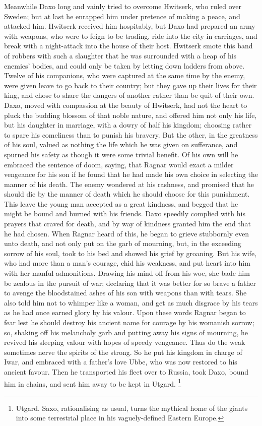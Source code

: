 \documentclass[10pt,a4paper]{report}
\begin{document}
Meanwhile Daxo long and vainly tried to overcome Hwitserk, who ruled over Sweden; but at last he enrapped him under pretence of making a peace, and attacked him. Hwitserk received him hospitably, but Daxo had prepared an army with weapons, who were to feign to be trading, ride into the city in carriages, and break with a night-attack into the house of their host. Hwitserk smote this band of robbers with such a slaughter that he was surrounded with a heap of his enemies' bodies, and could only be taken by letting down ladders from above. Twelve of his companions, who were captured at the same time by the enemy, were given leave to go back to their country; but they gave up their lives for their king, and chose to share the dangers of another rather than be quit of their own.\\

Daxo, moved with compassion at the beauty of Hwitserk, had not the heart to pluck the budding blossom of that noble nature, and offered him not only his life, but his daughter in marriage, with a dowry of half his kingdom; choosing rather to spare his comeliness than to punish his bravery. But the other, in the greatness of his soul, valued as nothing the life which he was given on sufferance, and spurned his safety as though it were some trivial benefit. Of his own will he embraced the sentence of doom, saying, that Ragnar would exact a milder vengeance for his son if he found that he had made his own choice in selecting the manner of his death. The enemy wondered at his rashness, and promised that he should die by the manner of death which he should choose for this punishment. This leave the young man accepted as a great kindness, and begged that he might be bound and burned with his friends. Daxo speedily complied with his prayers that craved for death, and by way of kindness granted him the end that he had chosen. When Ragnar heard of this, he began to grieve stubbornly even unto death, and not only put on the garb of mourning, but, in the exceeding sorrow of his soul, took to his bed and showed his grief by groaning. But his wife, who had more than a man's courage, chid his weakness, and put heart into him with her manful admonitions. Drawing his mind off from his woe, she bade him be zealous in the pursuit of war; declaring that it was better for so brave a father to avenge the bloodstained ashes of his son with weapons than with tears. She also told him not to whimper like a woman, and get as much disgrace by his tears as he had once earned glory by his valour. Upon these words Ragnar began to fear lest he should destroy his ancient name for courage by his womanish sorrow; so, shaking off his melancholy garb and putting away his signs of mourning, he revived his sleeping valour with hopes of speedy vengeance. Thus do the weak sometimes nerve the spirits of the strong. So he put his kingdom in charge of Iwar, and embraced with a father's love Ubbe, who was now restored to his ancient favour. Then he transported his fleet over to Russia, took Daxo, bound him in chains, and sent him away to be kept in Utgard. \footnote{Utgard.  Saxo, rationalising as usual, turns the mythical home of the giants into some terrestrial place in his vaguely-defined Eastern Europe.}\\
\end{document}
